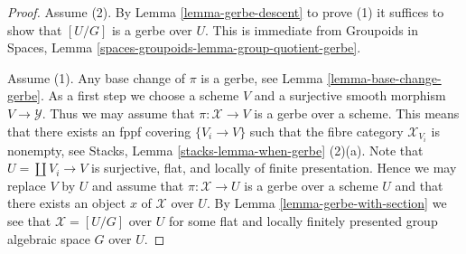 \documentclass[10pt,a4paper]{amsart}
\theoremstyle{plain}
\theoremstyle{definition}
\theoremstyle{remark}
\numberwithin{equation}{subsection}
\begin{document}
\begin{proof}
Assume (2). By
Lemma \ref{lemma-gerbe-descent}
to prove (1) it suffices to show that $[U/G]$ is a gerbe over $U$.
This is immediate from
Groupoids in Spaces, Lemma \ref{spaces-groupoids-lemma-group-quotient-gerbe}.

\medskip\noindent
Assume (1). Any base change of $\pi$ is a gerbe, see
Lemma \ref{lemma-base-change-gerbe}.
As a first step we choose a scheme $V$ and a surjective smooth morphism
$V \to \mathcal{Y}$. Thus we may assume that $\pi : \mathcal{X} \to V$
is a gerbe over a scheme. This means that there exists an
fppf covering $\{V_i \to V\}$ such that the fibre category
$\mathcal{X}_{V_i}$ is nonempty, see
Stacks, Lemma \ref{stacks-lemma-when-gerbe} (2)(a).
Note that $U = \coprod V_i \to V$ is surjective, flat, and
locally of finite presentation. Hence we may replace $V$ by $U$ and
assume that $\pi : \mathcal{X} \to U$ is a gerbe over a scheme $U$ and
that there exists an object $x$ of $\mathcal{X}$ over $U$. By
Lemma \ref{lemma-gerbe-with-section}
we see that $\mathcal{X} = [U/G]$ over $U$ for some flat
and locally finitely presented group algebraic space $G$ over $U$.
\end{proof}
\end{document}
